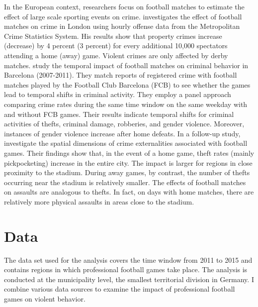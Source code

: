 In the European context, researchers focus on football matches to estimate the effect of large scale sporting events on crime. \cite{marie2016police} investigates the effect of football matches on crime in London using hourly offense data from the Metropolitan Crime Statistics System. His results show that property crimes increase (decrease) by 4 percent (3 percent) for every additional 10,000 spectators attending a home (away) game. Violent crimes are only affected by derby matches. \cite{montolio2016time} study the temporal impact of football matches on criminal behavior in Barcelona (2007-2011). They match reports of registered crime with football matches played by the Football Club Barcelona (FCB) to see whether the games lead to temporal shifts in criminal activity. They employ a panel approach comparing crime rates during the same time window on the same weekday with and without FCB games. Their results indicate temporal shifts for criminal activities of thefts, criminal damage, robberies, and gender violence. Moreover, instances of gender violence increase after home defeats. In a follow-up study, \cite{montolio2019measuring} investigate the spatial dimensions of crime externalities associated with football games. Their findings show that, in the event of a home game, theft rates (mainly pickpocketing) increase in the entire city. The impact is larger for regions in close proximity to the stadium. During away games, by contrast, the number of thefts occurring near the stadium is relatively smaller. The effects of football matches on assaults are analogous to thefts. In fact, on days with home matches, there are relatively more physical assaults in areas close to the stadium.





\bigskip
\section{Data}\label{sec_soc_ext:data} 
The data set used for the analysis covers the time window from 2011 to 2015 and contains regions in which professional football games take place. The analysis is conducted at the municipality level, the smallest territorial division in Germany. I combine various data sources to examine the impact of professional football games on violent behavior.



